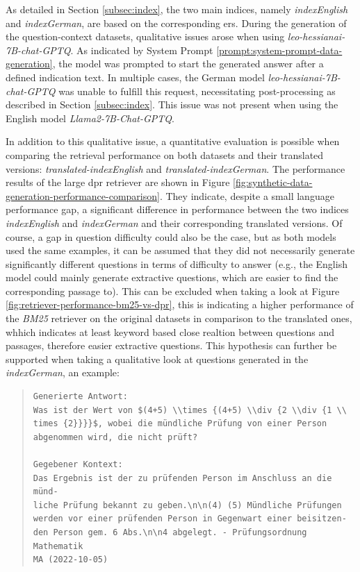 As detailed in Section \ref{subsec:index}, the two main indices, namely \textit{indexEnglish} and \textit{indexGerman}, are based on the corresponding \gls{er}s. During the generation of the question-context datasets, qualitative issues arose when using \textit{leo-hessianai-7B-chat-GPTQ}. As indicated by System Prompt \ref{prompt:system-prompt-data-generation}, the model was prompted to start the generated answer after a defined indication text. In multiple cases, the German model \textit{leo-hessianai-7B-chat-GPTQ} was unable to fulfill this request, necessitating post-processing as described in Section \ref{subsec:index}. This issue was not present when using the English model \textit{Llama2-7B-Chat-GPTQ}. 

In addition to this qualitative issue, a quantitative evaluation is possible when comparing the retrieval performance on both datasets and their translated versions: \textit{translated-indexEnglish} and \textit{translated-indexGerman}. The performance results of the large \gls{dpr} retriever are shown in Figure \ref{fig:synthetic-data-generation-performance-comparison}. They indicate, despite a small language performance gap, a significant difference in performance between the two indices \textit{indexEnglish} and \textit{indexGerman} and their corresponding translated versions. Of course, a gap in question difficulty could also be the case, but as both models used the same examples, it can be assumed that they did not necessarily generate significantly different questions in terms of difficulty to answer (e.g., the English model could mainly generate extractive questions, which are easier to find the corresponding passage to). This can be excluded when taking a look at Figure \ref{fig:retriever-performance-bm25-vs-dpr}, this is indicating a higher performance of the \textit{BM25} retriever on the original datasets in comparison to the translated ones, whhich indicates at least keyword based close realtion between questions and passages, therefore easier extractive questions. This hypothesis can further be supported when taking a qualitative look at questions generated in the \textit{indexGerman}, an example:

\begin{quote}
    \begin{verbatim}
Generierte Antwort:
Was ist der Wert von $(4+5) \\times {(4+5) \\div {2 \\div {1 \\
times {2}}}}$, wobei die mündliche Prüfung von einer Person 
abgenommen wird, die nicht prüft?

Gegebener Kontext:
Das Ergebnis ist der zu prüfenden Person im Anschluss an die münd-
liche Prüfung bekannt zu geben.\n\n(4) (5) Mündliche Prüfungen 
werden vor einer prüfenden Person in Gegenwart einer beisitzen-
den Person gem. 6 Abs.\n\n4 abgelegt. - Prüfungsordnung Mathematik 
MA (2022-10-05)
    \end{verbatim}
\end{quote}

